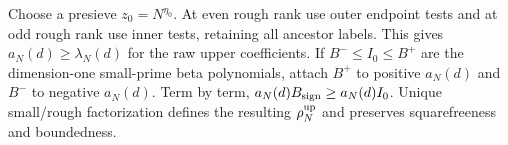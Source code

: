 Choose a presieve $z_0=N^{\eta_0}$.  At even rough rank use outer
endpoint tests and at odd rough rank use inner tests, retaining all
ancestor labels.  This gives $a_N(d)\ge\lambda_N(d)$ for the
raw upper coefficients.  If $B^-\le I_0\le B^+$ are the
dimension-one small-prime beta polynomials, attach $B^+$ to
positive $a_N(d)$ and $B^-$ to negative $a_N(d)$.  Term by term,
$a_N(d)B_{\rm sign}\ge a_N(d)I_0$.  Unique small/rough
factorization defines the resulting $\rho_N^{\rm up}$ and preserves
squarefreeness and boundedness.
